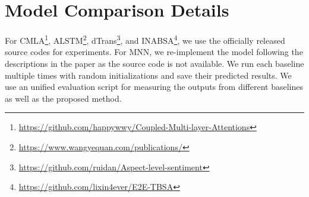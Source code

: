 \documentclass[11pt,a4paper]{article}
\begin{document}
\renewcommand{\arraystretch}{1.1}
\begin{table*}[t]
\centering
\small
{}
\caption{Model comparison in a setting without opinion term labels. Average results over 5 runs with random initialization are reported. $^*$ indicates the proposed method is significantly better than the other baselines ($p<0.05$) based on one-tailed unpaired t-test. }\label{main results_wo_op}
\end{table*}


\section{Model Comparison Details}
\label{model_comparison}
For CMLA\footnote{\url{https://github.com/happywwy/Coupled-Multi-layer-Attentions}},  ALSTM\footnote{\url{https://www.wangyequan.com/publications/}}, dTrans\footnote{\url{https://github.com/ruidan/Aspect-level-sentiment}}, and INABSA\footnote{\url{https://github.com/lixin4ever/E2E-TBSA}}, we use the officially released source codes for experiments. For MNN, we re-implement the model following the descriptions in the paper as the source code is not available. We run each baseline multiple times with random initializations and save their predicted results. We use an unified evaluation script for measuring the outputs from different baselines as well as the proposed method.
\end{document}
